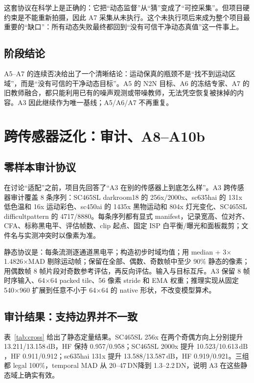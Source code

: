 \documentclass[11pt,a4paper,UTF8,fontset=fandol]{ctexart}
\newcommand{\dn}{\ensuremath{\,\mathrm{DN}}}
\newcommand{\db}{\ensuremath{\,\mathrm{dB}}}
\begin{document}
这套协议在科学上是正确的：它把“动态监督”从“猜”变成了“可控采集”。但项目硬约束是不能重新拍摄，因此 A7 采集从未执行。这个未执行项后来成为整个项目最重要的“缺口”：所有动态失败最终都回到“没有可信干净动态真值”这一件事上。

\subsection{阶段结论}

A5--A7 的连续否决给出了一个清晰结论：运动保真的瓶颈不是“找不到运动区域”，而是“没有可信的干净动态目标”。A5 的 N2N 目标、A6 的冻结专家、A7 的旧教师融合，都只能利用已有的噪声观测或带噪教师，无法凭空恢复被抹掉的内容。A3 因此继续作为唯一基线；A5/A6/A7 不再重复。

\section{跨传感器泛化：审计、A8--A10b}

\subsection{零样本审计协议}

在讨论“适配”之前，项目先回答了“A3 在别的传感器上到底怎么样”。A3 跨传感器审计覆盖 8 条序列：SC465SL darkroom18 的 256x/2000x、sc635hai 的 131x 低色温和 16x 运动彩色、sc450ai 的 1435x 黑物运动和 804x 灯光变化、SC465SL difficultpattern 的 4717/8880。每条序列都有显式 manifest，记录宽高、位对齐、CFA、标称黑电平、评估帧数、clip 起点、固定 ISP 白平衡/曝光和面板裁剪；文件名与实测冲突时以像素为准。

静态协议是：每条流测逐通道黑电平；构造初步时域均值；用 median + 3$\times$1.4826$\times$MAD 剔除运动帧；保留在全部、偶数、奇数帧中至少 90\% 静态的像素；用偶数帧 8 帧片段对奇数参考评估，再反向评估。输入与目标互斥。A3 保留 8 帧时序输入、64$\times$64 packed tile、56 像素 stride 和 EMA 权重；推理实现从固定 540$\times$960 扩展到任意不小于 64$\times$64 的 native 形状，不改变模型算术。

\subsection{审计结果：支持边界并不一致}

表~\ref{tab:cross} 给出了静态定量结果。SC465SL 256x 在两个奇偶方向上分别提升 13.211/13.158\db，HF 保持 0.957/0.958；SC465SL 2000x 提升 10.523/10.613\db，HF 0.911/0.912；sc635hai 131x 提升 13.588/13.587\db，HF 0.919/0.921。三组都 legal 100\%，temporal MAD 从 20--47\dn 降到 1.3--2.2\dn，说明 A3 在这些静态域上确实有效。
\end{document}
